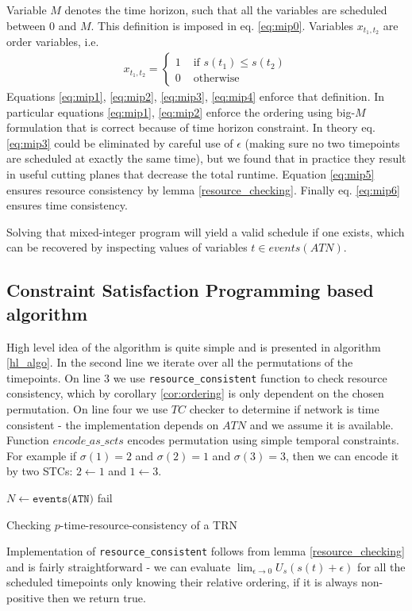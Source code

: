 Variable $M$ denotes the time horizon, such that all the variables are scheduled between $0$ and $M$. This definition is imposed in eq. \ref{eq:mip0}.
Variables $x_{t_1,t_2}$ are order variables, i.e.
\begin{align*}
x_{t_1, t_2} = \begin{cases}
1 &\text{ if }s(t_1) \leq s(t_2) \\
0 &\text{ otherwise}
\end{cases}
\end{align*}
Equations \ref{eq:mip1}, \ref{eq:mip2}, \ref{eq:mip3}, \ref{eq:mip4} enforce that definition. In particular equations \ref{eq:mip1}, \ref{eq:mip2} enforce the ordering using big-$M$ formulation that is correct because of time horizon constraint. In theory eq. \ref{eq:mip3} could be eliminated by careful use of $\epsilon$ (making sure no two timepoints are scheduled at exactly the same time), but we found that in practice they result in useful cutting planes that decrease the total runtime. Equation \ref{eq:mip5} ensures resource consistency by lemma \ref{resource_checking}. Finally eq. \ref{eq:mip6} ensures time consistency.

Solving that mixed-integer program will yield a valid schedule if one exists, which can be recovered by inspecting values of variables $t \in events(ATN)$.

\subsection{Constraint Satisfaction Programming based algorithm}
High level idea of the algorithm is quite simple and is presented in algorithm \ref{hl_algo}. In the second line we iterate over all the permutations of the timepoints. On line 3 we use \texttt{resource\_consistent} function to check resource consistency, which by corollary \ref{cor:ordering} is only dependent on the chosen permutation. On line four we use $TC$ checker to determine if network is time consistent - the implementation depends on $ATN$ and we assume it is available. Function $encode\_as\_scts$ encodes permutation using simple temporal constraints. For example if $\sigma(1) = 2$ and $\sigma(2) = 1$ and $\sigma(3) = 3$, then we can encode it by two STCs: $ 2 \leftarrow 1 $ and $1 \leftarrow 3$.

\begin{algorithm}[h]
    \label{hl_algo}
    $N \leftarrow \texttt{events(ATN)}$\;
    fail\;
    \caption{Checking $p$-time-resource-consistency of a TRN }
\end{algorithm}
Implementation of \texttt{resource\_consistent} follows from lemma \ref{resource_checking} and is fairly straightforward - we can evaluate $\lim_{\epsilon \to 0} U_s(s(t) + \epsilon)$ for all the scheduled timepoints only knowing their relative ordering, if it is always non-positive then we return true.

